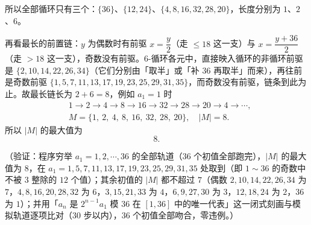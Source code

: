 \begin{answer}
所以全部循环只有三个：\(\{36\}\)、\(\{12,24\}\)、\(\{4,8,16,32,28,20\}\)，长度分别为 \(1\)、\(2\)、\(6\)。

再看最长的前置链：\(y\) 为偶数时有前驱 \(x=\dfrac{y}{2}\)（走 \(\leqslant18\) 这一支）与 \(x=\dfrac{y+36}{2}\)（走 \(>18\) 这一支），奇数没有前驱。\(6\)-循环各元中，直接映入循环的非循环前驱是 \(\{2,10,14,22,26,34\}\)（它们分别由「取半」或「补 \(36\) 再取半」而来），再往前是奇数前驱 \(\{1,5,7,11,13,17,19,23,25,29,31,35\}\)，而奇数没有前驱，链条到此为止。故最长链长为 \(2+6=8\)，例如 \(a_{1}=1\) 时
\nopagebreak[4]
\[
\begin{aligned}
&1\to2\to4\to8\to16\to32\to28\to20\to4\to\cdots,\\
&M=\{1,\ 2,\ 4,\ 8,\ 16,\ 32,\ 28,\ 20\},\quad|M|=8 .
\end{aligned}
\]
所以 \(|M|\) 的最大值为
\nopagebreak[4]
\[
8 .
\]

（验证：程序穷举 \(a_{1}=1,2,\cdots,36\) 的全部轨道（\(36\) 个初值全部跑完），\(|M|\) 的最大值为 \(8\)，在 \(a_{1}=1,5,7,11,13,17,19,23,25,29,31,35\) 处取到（即 \(1\sim36\) 的奇数中不被 \(3\) 整除的 \(12\) 个值）；其余初值的 \(|M|\) 都不超过 \(7\)（偶数 \(2,10,14,22,26,34\) 为 \(7\)，\(4,8,16,20,28,32\) 为 \(6\)，\(3,15,21,33\) 为 \(4\)，\(6,9,27,30\) 为 \(3\)，\(12,18,24\) 为 \(2\)，\(36\) 为 \(1\)）；并用「\(a_{n}\) 是 \(2^{n-1}a_{1}\) 模 \(36\) 在 \([1,36]\) 中的唯一代表」这一闭式刻画与模拟轨道逐项比对（\(30\) 步以内），\(36\) 个初值全部吻合，零违例。）




\end{answer}